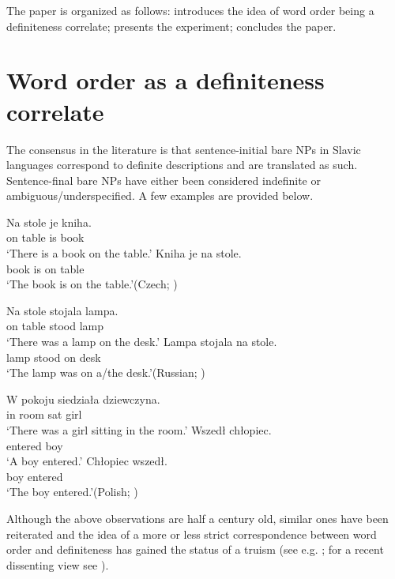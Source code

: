 \documentclass[output=paper]{langscibook}
\begin{document}
The paper is organized as follows:  introduces the idea of word order being a definiteness correlate;  presents the experiment;  concludes the paper.

\section{Word order as a definiteness correlate}\label{sim-dem:sec:wo}

The consensus in the literature is that sentence-initial bare NPs in Slavic languages correspond to definite descriptions and are translated as such. Sentence-final bare NPs have either been considered indefinite or ambiguous/under\-speci\-fied. A few examples are provided below.

\ea\ea\gll Na stole je kniha.\\
on table is book\\
\glt `There is a book on the table.'
\ex\gll Kniha je na stole.\\
book is on table\\
\glt `The book is on the table.'\hfill (Czech; \citealt[42]{Kramsky1972})
\z\z

\ea\label{sim-dem:ex:rus1}\ea\gll Na stole stojala lampa.\\
on table stood lamp\\
\glt `There was a lamp on the desk.'
\ex\gll Lampa stojala na stole.\\
lamp stood on desk\\
\glt `The lamp was on a/the desk.'\hfill (Russian; \citealt[266]{Chvany1973})
\z\z

\ea\label{sim-dem:ex:pol1}\gll W pokoju siedziała dziewczyna.\\
in room sat girl\\
\glt `There was a girl sitting in the room.'
\ea\gll Wszedł chłopiec.\label{sim-dem:ex:pol1a}\\
entered boy\\
\glt `A boy entered.'
\ex\gll Chłopiec wszedł.\label{sim-dem:ex:pol1b}\\
boy entered\\
\glt `The boy entered.'\hfill (Polish; \citealt[215]{Szwedek1974a})
\z\z

\noindent Although the above observations are half a century old, similar ones have been reiterated and the idea of a more or less strict correspondence between word order and definiteness has gained the status of a truism (see e.g. \citealt{Szwedek1974,Szwedek2011,Hlavsa1975,Birkenmaier1979,Gladrow1979,Gladrow1989,Weiss1983,Yokoyama1986,Hauenschild1993,Junghanns.Zybatow1997,Nesset1999,Leiss2000,Brun2001,Biskup2006,Kucerova2007,Kucerova2012,Topolinjska2009,Geist2010,Titov2012,Titov2017,Czardybon2017}; for a recent dissenting view see \citealt{Buncic2014}).
\end{document}
